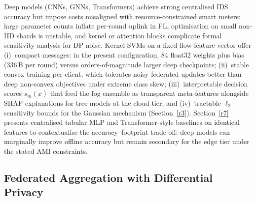 \documentclass[sensors,article,submit,pdftex,moreauthors]{Definitions/mdpi}
\begin{document}
Deep models (CNNs, GNNs, Transformers) achieve strong centralised IDS accuracy but impose costs misaligned with resource-constrained smart meters: large parameter counts inflate per-round uplink in FL, optimisation on small non-IID shards is unstable, and kernel or attention blocks complicate formal sensitivity analysis for DP noise. Kernel SVMs on a fixed flow-feature vector offer (i)~compact messages: in the present configuration, 84 float32 weights plus bias (336\,B per round) versus orders-of-magnitude larger deep checkpoints; (ii)~stable convex training per client, which tolerates noisy federated updates better than deep non-convex objectives under extreme class skew; (iii)~interpretable decision scores $s_m(x)$ that feed the fog ensemble as transparent meta-features alongside SHAP explanations for tree models at the cloud tier; and (iv)~tractable $\ell_2$-sensitivity bounds for the Gaussian mechanism (Section~\ref{r3}). Section~\ref{r7} presents centralised tabular MLP and Transformer-style baselines on identical features to contextualise the accuracy--footprint trade-off: deep models can marginally improve offline accuracy but remain secondary for the edge tier under the stated AMI constraints.

\subsection{Federated Aggregation with Differential Privacy}
\end{document}

